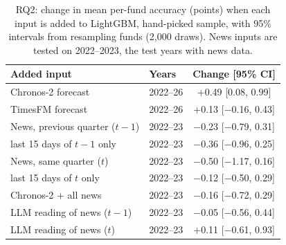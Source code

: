 \begin{table}[t]
  \caption{RQ2: change in mean per-fund accuracy (points) when each input is added to LightGBM,
  hand-picked sample, with 95\% intervals from resampling funds (2,000 draws). News inputs are
  tested on 2022--2023, the test years with news data.}
  \label{tab:rq2}
  \small
  \setlength{\tabcolsep}{4pt}
  \begin{tabular}{@{}llc@{}}
    \toprule
    Added input & Years & Change [95\% CI] \\
    \midrule
    Chronos-2 forecast & 2022--26 & +0.49 [0.08, 0.99] \\
    TimesFM forecast & 2022--26 & +0.13 [\ensuremath{-}0.16, 0.43] \\
    News, previous quarter ($t-1$) & 2022--23 & \ensuremath{-}0.23 [\ensuremath{-}0.79, 0.31] \\
    \quad last 15 days of $t-1$ only & 2022--23 & \ensuremath{-}0.36 [\ensuremath{-}0.96, 0.25] \\
    News, same quarter ($t$) & 2022--23 & \ensuremath{-}0.50 [\ensuremath{-}1.17, 0.16] \\
    \quad last 15 days of $t$ only & 2022--23 & \ensuremath{-}0.12 [\ensuremath{-}0.50, 0.29] \\
    Chronos-2 + all news & 2022--23 & \ensuremath{-}0.16 [\ensuremath{-}0.72, 0.29] \\
    LLM reading of news ($t-1$) & 2022--23 & \ensuremath{-}0.05 [\ensuremath{-}0.56, 0.44] \\
    LLM reading of news ($t$) & 2022--23 & +0.11 [\ensuremath{-}0.61, 0.93] \\
    \bottomrule
  \end{tabular}
\end{table}
